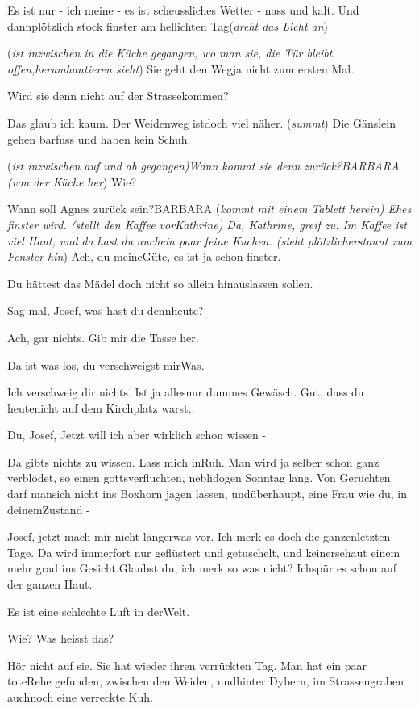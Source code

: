 \documentclass[
	final,
	a4paper,
	ngerman,
	mpinclude = true, %
	twoside = true,
	open = right,
	cleardoublepage = plain,
	DIV = 13,
	BCOR = 1cm,
	titlepage = firstiscover,
	]{scrbook}
\newcommand{\direction}[1]{(\textit{#1})}
\newcommand{\thecharacter}[1]{\textup{\textsc{#1}}\xspace}
\newcommand{\theBarbara}{\thecharacter{Barbara}}
\newcommand{\theJosef}{\thecharacter{Josef}}
\newcommand{\theKathrine}{\thecharacter{Kathrine}}
\newcommand{\character}[1]{\item[#1]}
\newcommand{\Barbara}{\character{\theBarbara}}
\newcommand{\Josef}{\character{\theJosef}}
\newcommand{\Kathrine}{\character{\theKathrine}}
\begin{document}
\begin{play}
\Josef
Es ist nur - ich meine - es ist scheussliches Wetter - nass und kalt. Und dannplötzlich stock finster am hellichten Tag\direction{dreht das Licht an}

\Barbara
\direction{ist inzwischen in die Küche gegangen, wo man sie, die Tür bleibt offen,herumhantieren sieht} Sie geht den Wegja nicht zum ersten Mal.

\Josef
Wird sie denn nicht auf der Strassekommen?

\Barbara
Das glaub ich kaum. Der Weidenweg istdoch viel näher. \direction{summt} Die Gänslein gehen barfuss und haben kein Schuh.

\Josef
\direction{ist inzwischen auf und ab gegangen)Wann kommt sie denn zurück?BARBARA (von der Küche her} Wie?

\Josef
Wann soll Agnes zurück sein?BARBARA \direction{kommt mit einem Tablett herein) Ehes finster wird. (stellt den Kaffee vorKathrine) Da, Kathrine, greif zu. Im Kaffee ist viel Haut, und da hast du auchein paar feine Kuchen. (sieht plötzlicherstaunt zum Fenster hin} Ach, du meineGüte, es ist ja schon finster.

\Josef
Du hättest das Mädel doch nicht so allein hinauslassen sollen.

\Barbara
Sag mal, Josef, was hast du dennheute?

\Josef
Ach, gar nichts. Gib mir die Tasse her.

\Barbara
Da ist was los, du verschweigst mirWas.

\Josef
Ich verschweig dir nichts. Ist ja allesnur dummes Gewäsch. Gut, dass du heutenicht auf dem Kirchplatz warst..

\Barbara
Du, Josef, Jetzt will ich aber wirklich schon wissen -

\Josef
Da gibts nichts zu wissen. Lass mich inRuh. Man wird ja selber schon ganz verblödet, so einen gottsverfluchten, neblidogen Sonntag lang. Von Gerüchten darf mansich nicht ins Boxhorn jagen lassen, undüberhaupt, eine Frau wie du, in deinemZustand -

\Barbara
Josef, jetzt mach mir nicht längerwas vor. Ich merk es doch die ganzenletzten Tage. Da wird immerfort nur geflüstert und getuschelt, und keinersehaut einem mehr grad ins Gesicht.Glaubst du, ich merk so was nicht? Ichspür es schon auf der ganzen Haut.

\Kathrine
Es ist eine schlechte Luft in derWelt.

\Barbara
Wie? Was heisst das?

\Josef
Hör nicht auf sie. Sie hat wieder ihren verrückten Tag. Man hat ein paar toteRehe gefunden, zwischen den Weiden, undhinter Dybern, im Strassengraben auchnoch eine verreckte Kuh.


\end{play}
\end{document}

